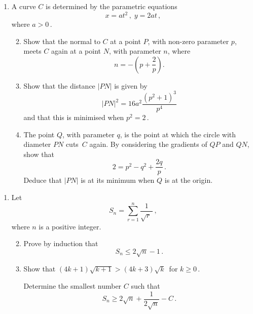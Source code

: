 \documentclass[a4, 11pt]{report}
\newlength{\qspace}
\newcounter{qnumber}
\newenvironment{question}%
 {\vspace{\qspace}
  \begin{enumerate}[\bfseries 1\quad][10]%
    \setcounter{enumi}{\value{qnumber}}%
    \item%
 }
{
  \end{enumerate}
  \filbreak
  \stepcounter{qnumber}
 }
\newenvironment{questionparts}[1][1]%
 {
  \begin{enumerate}[\bfseries (i)]%
    \setcounter{enumii}{#1}
    \addtocounter{enumii}{-1}
    \setlength{\itemsep}{2mm}
    \setlength{\parskip}{5pt}
 }
 {
  \end{enumerate}
 }
\def\le{\leqslant}
\def\ge{\geqslant}
\begin{document}

\begin{question}
A curve $C$ is determined by the parametric equations
\[
x=at^2 \, , \; y = 2at\,,
\]
where $a>0$\,.
\begin{questionparts}
\item Show that the normal to 
$C$ at a point $P$, with non-zero parameter $p$, 
meets $C$
again at a point $N$, with parameter $n$, where
\[
n=  - \left( p + \frac{2}{p} \right).
\]

\item
Show that the distance $\left| PN \right|$ is given by
\[
\vert PN\vert^2 = 16a^2\frac{(p^2+1)^3}{p^4}
\]
and that this is minimised when $p^2=2\,$. 

\item The point  $Q$, with parameter $q$, 
is the point at which the circle with 
diameter $PN$ cuts~$C$ again. 
By considering the gradients of $QP$ and $QN$,
show that 
\[
2 = p^2-q^2 + \frac{2q}p
\,.
\]
Deduce that  $\left| PN \right|$ is at its minimum when 
$Q$ is at the origin.

\end{questionparts}
\end{question}


\begin{question}
Let
\[
S_n = \sum_{r=1}^n \frac 1 {\sqrt r \ }
\,,
\]
where $n$ is a positive integer.
\begin{questionparts}


\item 
Prove by induction that 
\[
 S_n  \le   2\sqrt n -1\,
.
\]

\item
Show that $(4k+1)\sqrt{k+1} > (4k+3)\sqrt k\,$ for $k\ge0\,$.

Determine the smallest number $C$ such that
\[
S_n \ge 2\sqrt n + \frac 1 {2\sqrt n} -C
\,.\]
 

\end{questionparts}

\end{question}
\end{document}
